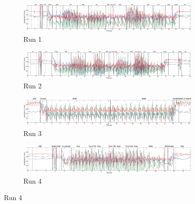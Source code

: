 \begin{figure}
  \centering
  \begin{subfigure}{1\textwidth}
    \includegraphics[width=\textwidth]{./Figures/chapter6/data_collection/run-1-walk-run-roemer/data_plot_acc_with_discovered_cps.eps}
    \caption{Run 1}
    \label{fig:data_with_cps_run_1}
  \end{subfigure}

  \begin{subfigure}{1\textwidth}
    \includegraphics[width=\textwidth]{./Figures/chapter6/data_collection/run-2-walk-run-jos/data_plot_acc_with_discovered_cps.eps}
    \caption{Run 2}
    \label{fig:data_with_cps_run_2}
  \end{subfigure}

  \begin{subfigure}{1\textwidth}
    \includegraphics[width=\textwidth]{./Figures/chapter6/data_collection/run-3-walk-turn-roemer/data_plot_acc_with_discovered_cps.eps}
    \caption{Run 3}
    \label{fig:data_with_cps_run_3}
  \end{subfigure}

  \begin{subfigure}{1\textwidth}
    \includegraphics[width=\textwidth]{./Figures/chapter6/data_collection/run-4-run-fountain-roemer/data_plot_acc_with_discovered_cps.eps}
    \caption{Run 4}
    \label{fig:data_with_cps_run_4}
  \end{subfigure}


\end{figure}
